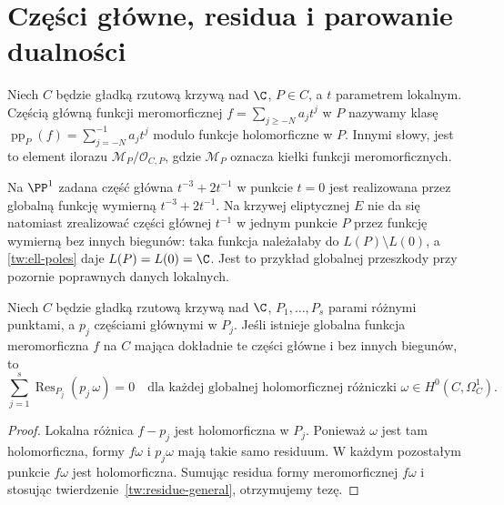 \section{Części główne, residua i parowanie dualności}
\label{sec:principal-residue-pairing}

\begin{definicja}
Niech $C$ będzie gładką rzutową krzywą nad $\C$,
$P\in C$, a $t$ parametrem lokalnym. Częścią główną
funkcji meromorficznej $f=\sum_{j\ge-N}a_jt^j$
w $P$ nazywamy klasę
$\operatorname{pp}_P(f)=\sum_{j=-N}^{-1}a_jt^j$
modulo funkcje holomorficzne w $P$.
Innymi słowy, jest to element ilorazu
$\mathcal M_P/\mathcal O_{C,P}$, gdzie
$\mathcal M_P$ oznacza kiełki funkcji meromorficznych.
\end{definicja}

\begin{przyklad}
Na $\PP^1$ zadana część główna $t^{-3}+2t^{-1}$
w punkcie $t=0$ jest realizowana przez globalną
funkcję wymierną $t^{-3}+2t^{-1}$. Na krzywej
eliptycznej $E$ nie da się natomiast zrealizować
części głównej $t^{-1}$ w jednym punkcie $P$ przez
funkcję wymierną bez innych biegunów:
taka funkcja należałaby do $L(P)\setminus L(0)$,
a \ref{tw:ell-poles} daje $L(P)=L(0)=\C$.
Jest to przykład globalnej przeszkody przy
pozornie poprawnych danych lokalnych.
\end{przyklad}

\begin{twierdzenie}
Niech $C$ będzie gładką rzutową krzywą nad $\C$,
$P_1,\ldots,P_s$ parami różnymi punktami, a $p_j$
częściami głównymi w $P_j$. Jeśli istnieje globalna
funkcja meromorficzna $f$ na $C$ mająca dokładnie
te części główne i bez innych biegunów, to
\[
\sum_{j=1}^{s}\operatorname{Res}_{P_j}
  (p_j\,\omega)=0
\quad\text{dla każdej globalnej holomorficznej
różniczki }\omega\in H^0(C,\Omega^1_C).
\]
\end{twierdzenie}
\begin{proof}
Lokalna różnica $f-p_j$ jest holomorficzna
w $P_j$. Ponieważ $\omega$ jest tam holomorficzna,
formy $f\omega$ i $p_j\omega$ mają takie samo
residuum. W każdym pozostałym punkcie $f\omega$
jest holomorficzna. Sumując residua formy
meromorficznej $f\omega$ i stosując
twierdzenie~\ref{tw:residue-general}, otrzymujemy tezę.
\end{proof}

